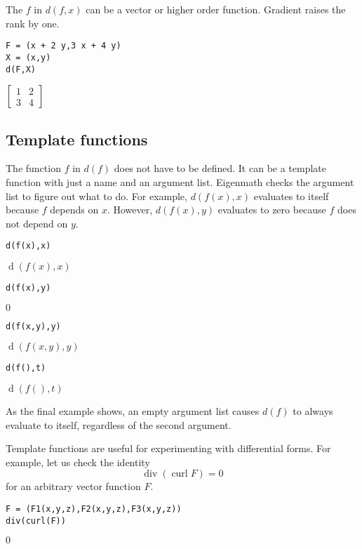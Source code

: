 \bigskip
\noindent
The $f$ in $d(f,x)$ can be a vector or higher order function.
Gradient raises the rank by one.

{\color{blue}
\begin{verbatim}
F = (x + 2 y,3 x + 4 y)
X = (x,y)
d(F,X)
\end{verbatim}
}

\noindent
$\displaystyle
\begin{bmatrix}
1 & 2
\\[1ex]
3 & 4
\end{bmatrix}
$

\subsection{Template functions}

The function $f$ in $d(f)$ does not have to be defined.
It can be a template function with just a name and an argument list.
Eigenmath checks the argument list to figure out what to do.
For example, $d(f(x),x)$ evaluates to itself because $f$ depends on $x$.
However, $d(f(x),y)$ evaluates to zero because $f$ does not depend on $y$.

{\color{blue}
\begin{verbatim}
d(f(x),x)
\end{verbatim}
}

\noindent
$\operatorname{d}(f(x),x)$

{\color{blue}
\begin{verbatim}
d(f(x),y)
\end{verbatim}
}

\noindent
$0$

{\color{blue}
\begin{verbatim}
d(f(x,y),y)
\end{verbatim}
}

\noindent
$\operatorname{d}(f(x,y),y)$

{\color{blue}
\begin{verbatim}
d(f(),t)
\end{verbatim}
}

\noindent
$\operatorname{d}(f(),t)$

\bigskip
\noindent
As the final example shows, an empty argument list causes
$d(f)$ to always evaluate to itself, regardless
of the second argument.

\bigskip
\noindent
Template functions are useful for experimenting with differential forms.
For example, let us check the identity
$$\operatorname{div}(\operatorname{curl}{F})=0$$
for an arbitrary vector function $F$.

{\color{blue}
\begin{verbatim}
F = (F1(x,y,z),F2(x,y,z),F3(x,y,z))
div(curl(F))
\end{verbatim}
}

\noindent
$0$
